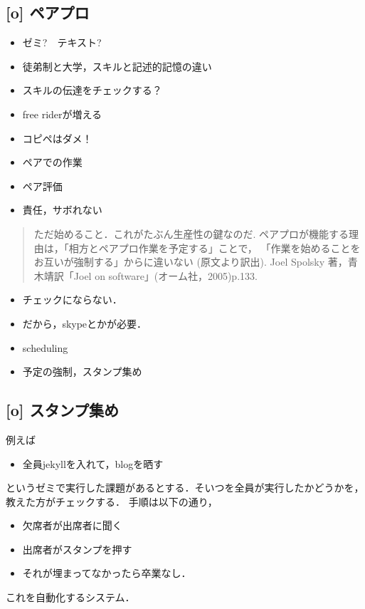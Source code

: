 \documentclass{jsarticle}
\begin{document}
\subsection{[o] ペアプロ}
\label{sec:orgf894188}
\begin{itemize}
\item ゼミ?　テキスト?
\item 徒弟制と大学，スキルと記述的記憶の違い
\item スキルの伝達をチェックする？
\item free riderが増える
\item コピペはダメ！
\item ペアでの作業
\item ペア評価
\item 責任，サボれない
\end{itemize}

\begin{quote}
ただ始めること．これがたぶん生産性の鍵なのだ.
ペアプロが機能する理由は，「相方とペアプロ作業を予定する」ことで，
「作業を始めることをお互いが強制する」からに違いない
(原文より訳出).
Joel Spolsky 著，青木靖訳「Joel on software」(オーム社，2005)p.133.
\end{quote}

\begin{itemize}
\item チェックにならない．
\item だから，skypeとかが必要．

\item scheduling
\item 予定の強制，スタンプ集め
\end{itemize}
\subsection{[o] スタンプ集め}
\label{sec:orgda9ba25}
例えば
\begin{itemize}
\item 全員jekyllを入れて，blogを晒す
\end{itemize}
というゼミで実行した課題があるとする．そいつを全員が実行したかどうかを，教えた方がチェックする．
手順は以下の通り，
\begin{itemize}
\item 欠席者が出席者に聞く
\item 出席者がスタンプを押す
\item それが埋まってなかったら卒業なし．
\end{itemize}
これを自動化するシステム．
\end{document}

